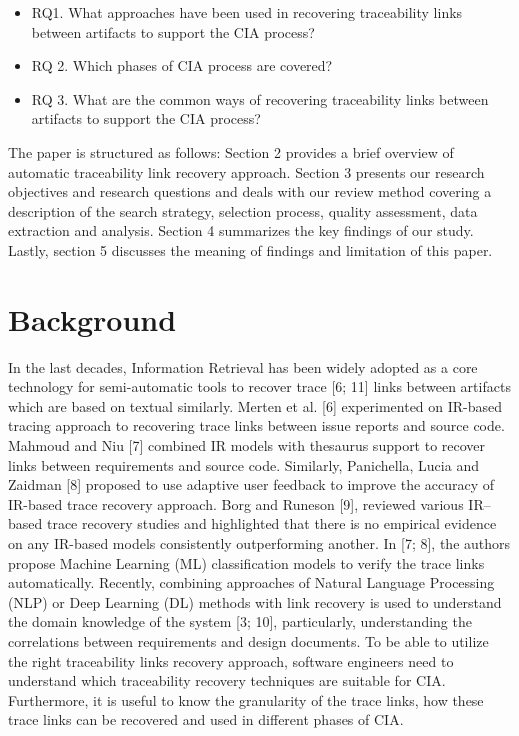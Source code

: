 \documentclass[conference]{IEEEtran}
\begin{document}
\begin{itemize}
\item RQ1. What approaches have been used in recovering traceability links between artifacts to support the CIA process? 
\item RQ 2. Which phases of CIA process are covered? 
\item RQ 3. What are the common ways of recovering traceability links between artifacts to support the CIA process? 
\end{itemize}
The paper is structured as follows: Section 2 provides a brief overview of automatic traceability link recovery approach. Section 3 presents our research objectives and research questions and deals with our review method covering a description of the search strategy, selection process, quality assessment, data extraction and analysis. Section 4 summarizes the key findings of our study. Lastly, section 5 discusses the meaning of findings and limitation of this paper.

\section{Background}
In the last decades, Information Retrieval has been widely adopted as a core technology for semi-automatic tools to recover trace [6; 11] links between artifacts which are based on textual similarly. Merten et al. [6] experimented on IR-based tracing approach to recovering trace links between issue reports and source code. Mahmoud and Niu [7] combined IR models with thesaurus support to recover links between requirements and source code. Similarly, Panichella, Lucia and Zaidman [8] proposed to use adaptive user feedback to improve the accuracy of IR-based trace recovery approach. Borg and Runeson [9], reviewed various IR–based trace recovery studies and highlighted that there is no empirical evidence on any IR-based models consistently outperforming another. In [7; 8], the authors propose Machine Learning (ML) classification models to verify the trace links automatically. Recently, combining approaches of Natural Language Processing (NLP) or Deep Learning (DL) methods with link recovery is used to understand the domain knowledge of the system [3; 10], particularly, understanding the correlations between requirements and design documents.   To be able to utilize the right traceability links recovery approach, software engineers need to understand which traceability recovery techniques are suitable for CIA. Furthermore, it is useful to know the granularity of the trace links, how these trace links can be recovered and used in different phases of CIA. 
\end{document}
